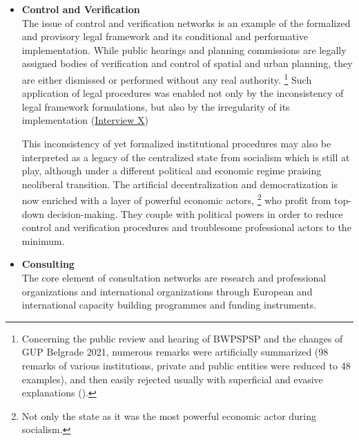 \documentclass[11pt]{report}
\begin{document}
\begin{itemize}
\item \textbf{Control and Verification}
\\
The issue of control and verification networks is an example of the formalized and provisory legal framework and its conditional and performative implementation. While public hearings and planning commissions are legally assigned bodies of verification and control of spatial and urban planning, they are either dismissed or performed without any real authority.
\footnote{Concerning the public review and hearing of BWPSPSP and the changes of GUP Belgrade 2021, numerous remarks were artificially summarized (98 remarks of various institutions, private and public entities were reduced to 48 examples), and then easily rejected usually with superficial and evasive explanations (\cite{Alternativni izvestaj}).}
Such application of legal procedures was enabled  not only by the inconsistency of legal framework formulations, but also by the irregularity of its implementation (\href{InterviewX}{Interview X})

This inconsistency of yet formalized institutional procedures may also be interpreted as a legacy of the centralized state from socialism which is still at play, although under a different political and economic regime praising neoliberal transition.
The artificial decentralization and democratization is now enriched with a layer of powerful economic actors,
\footnote{Not only the state as it was  the most powerful economic actor during socialism.}
who profit from top-down decision-making.
They couple with political powers in order to reduce control and verification procedures and troublesome professional actors to the minimum.
\\

\item \textbf{Consulting}
\\
The core element of consultation networks are research and professional organizations and international organizations through European and international capacity building programmes and funding instruments.


\end{itemize}
\end{document}
